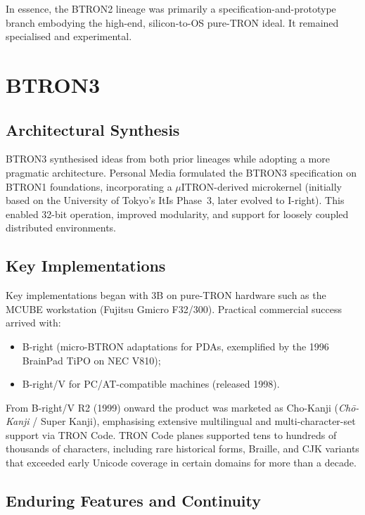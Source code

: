 \documentclass{article}
\begin{document}
In essence, the BTRON2 lineage was primarily a specification-and-prototype branch embodying the high-end, silicon-to-OS pure-TRON ideal. It remained specialised and experimental.

\newpage
\section{BTRON3}

\subsection{Architectural Synthesis}

BTRON3 synthesised ideas from both prior lineages while adopting a more pragmatic architecture. Personal Media formulated the BTRON3 specification on BTRON1 foundations, incorporating a \(\mu\)ITRON-derived microkernel (initially based on the University of Tokyo's ItIs Phase~3, later evolved to I-right). This enabled 32-bit operation, improved modularity, and support for loosely coupled distributed environments.

\subsection{Key Implementations}

Key implementations began with 3B on pure-TRON hardware such as the MCUBE workstation (Fujitsu Gmicro F32/300). Practical commercial success arrived with:

\begin{itemize}
  \item B-right (micro-BTRON adaptations for PDAs, exemplified by the 1996 BrainPad TiPO on NEC V810);
  \item B-right/V for PC/AT-compatible machines (released 1998).
\end{itemize}

From B-right/V R2 (1999) onward the product was marketed as Cho-Kanji (\textit{Ch\=o-Kanji} / Super Kanji), emphasising extensive multilingual and multi-character-set support via TRON Code. TRON Code planes supported tens to hundreds of thousands of characters, including rare historical forms, Braille, and CJK variants that exceeded early Unicode coverage in certain domains for more than a decade.

\subsection{Enduring Features and Continuity}
\end{document}
